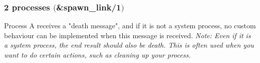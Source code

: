 \begin{frame}
    \frametitle{2 processes $($\&spawn\_link/1$)$}
    \begin{center}
    \end{center}

    Process A receives a "death message", and if it is not a system process, no custom behaviour can be implemented when this message is received.
    \vfill
    \textit{Note: Even if it is a system process, the end result should also be death. 
    This is often used when you want to do certain actions, such as cleaning up your process.}
\end{frame}